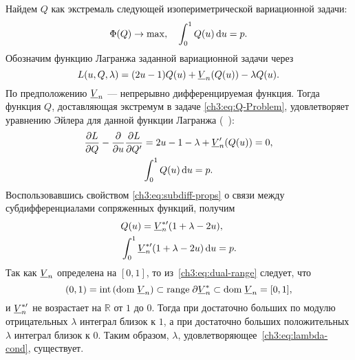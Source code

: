 {Найдем $Q$ как экстремаль следующей изопериметрической вариационной задачи:
\begin{align}
  \label{ch3:eq:Q-Problem}
  \Phi(Q) \rightarrow \max, \quad
  \int_0^1 Q(u) \mathop{}\!\mathrm{d} u = p.
\end{align}
Обозначим функцию Лагранжа заданной вариационной задачи через
\[
  L(u, Q, \lambda) = (2u - 1) Q(u) + \LV{n}(Q(u)) - \lambda Q(u).
\]
По предположению $\LV{n}$ --- непрерывно дифференцируемая функция.
Тогда функция $Q$, доставляющая экстремум в задаче \eqref{ch3:eq:Q-Problem}, удовлетворяет уравнению Эйлера для данной функции Лагранжа (\seename~\cite{elsgolc69}):
\begin{gather*}
  \frac{\partial L}{\partial Q} - \frac{\partial}{\partial u} \frac{\partial L}{\partial Q'}
  = 2u - 1 - \lambda + \LV[\prime]{n}(Q(u)) = 0,\\
  \int_0^1 Q(u) \di u = p.
\end{gather*}
Воспользовавшись свойством \eqref{ch3:eq:subdiff-props} о связи между субдифференциалами сопряженных функций, получим
\begin{align}
  \label{ch3:eq:Q(u)}
  &Q(u) = \LV[*\prime]{n}(1+\lambda-2u),\\
  \label{ch3:eq:lambda-cond}
  &\int_0^1 \LV[ *\prime ]{n}(1+\lambda-2u) \di u = p.
\end{align}
Так как $\LV{n}$ определена на $[0, 1]$, то из~\eqref{ch3:eq:dual-range} следует, что
\begin{equation*}
  (0, 1)
  = \mathrm{int} \left( \dom \LV{n} \right)
  \subset \range \partial \LV[*]{n}
  \subset \dom \LV{n} = [0, 1],
\end{equation*}
и $\LV[ *\prime ]{n}$ не возрастает на $\mathbb{R}$ от $1$ до $0$.
Тогда при достаточно больших по модулю отрицательных $\lambda$ интеграл близок к $1$, а при достаточно больших положительных $\lambda$ интеграл близок к 0.
Таким образом, $\lambda$, удовлетворяющее~\eqref{ch3:eq:lambda-cond}, существует.

}
